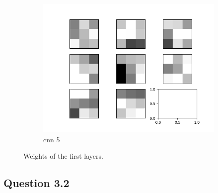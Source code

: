 \documentclass{assignment}
\begin{document}
\begin{figure}[htbp!]
\begin{subfigure}{0.3\textwidth}
        \includegraphics[width=\textwidth]{figures/weights_cnn_5.png}
        \caption{cnn 5}
    \end{subfigure}\hfill
    \caption{Weights of the first layers.}
    \label{fig:weights}
\end{figure}

\subsection{Question 3.2}
\end{document}
